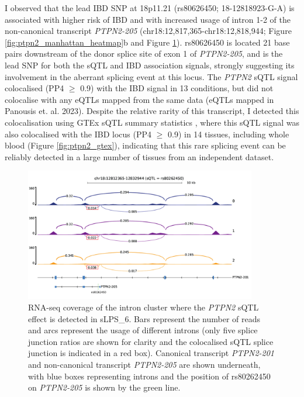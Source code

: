 I observed that the lead IBD SNP at 18p11.21 (rs80626450; 18-12818923-G-A) is associated with higher risk of IBD and with increased usage of intron 1-2 of the non-canonical transcript \textit{PTPN2-205} (chr18:12,817,365-chr18:12,818,944; Figure \ref{fig:ptpn2_manhattan_heatmap}b and  Figure \ref{fig:ptpn2_sashimi}). rs80626450 is located 21 base pairs downstream of the donor splice site of exon 1 of \textit{PTPN2-205}, and is the lead SNP for both the sQTL and IBD association signals, strongly suggesting its involvement in the aberrant splicing event at this locus. The \textit{PTPN2} sQTL signal colocalised (PP4 $\geq$ 0.9) with the IBD signal in 13 conditions, but did not colocalise with any eQTLs mapped from the same data (eQTLs mapped in Panousis et. al. 2023). Despite the relative rarity of this transcript, I detected this colocalisation using GTEx sQTL summary statistics \cite{The_GTEx_Consortium2020-gg}, where this sQTL signal was also colocalised with the IBD locus (PP4 $\geq$ 0.9) in 14 tissues, including whole blood (Figure \ref{fig:ptpn2_gtex}), indicating that this rare splicing event can be reliably detected in a large number of tissues from an independent dataset. \\ 

\begin{figure}[H]
  \centering
  \includegraphics[width=0.9\textwidth]{ptpn2_sashimi}
  \caption[\textit{PTPN2} RNA-seq coverage plot]{RNA-seq coverage of the intron cluster where the \textit{PTPN2} sQTL effect is detected in sLPS\_6. Bars represent the number of reads and arcs represent the usage of different introns (only five splice junction ratios are shown for clarity and the colocalised sQTL splice junction is indicated in a red box). Canonical transcript \textit{PTPN2-201} and non-canonical transcript \textit{PTPN2-205} are shown underneath, with blue boxes representing introns and the position of rs80262450 on \textit{PTPN2-205} is shown by the green line.}
  \label{fig:ptpn2_sashimi}   
\end{figure}


